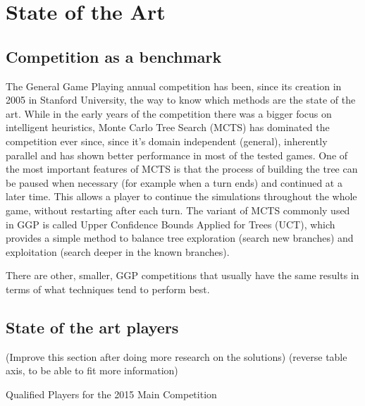 \chapter{State of the Art}
\label{chapter:state_of_the_art}

\section{Competition as a benchmark}
The General Game Playing annual competition has been, since its creation in 2005 in Stanford University, the way to know which methods are the state of the art. 
While in the early years of the competition there was a bigger focus on intelligent heuristics, Monte Carlo Tree Search (MCTS) has dominated the competition ever since, since it’s domain independent (general), inherently parallel and has shown better performance in most of the tested games. One of the most important features of MCTS is that the process of building the tree can be paused when necessary (for example when a turn ends) and continued at a later time. This allows a player to continue the simulations throughout the whole game, without restarting after each turn.
The variant of MCTS commonly used in GGP is called Upper Confidence Bounds Applied for Trees (UCT), which provides a simple method to balance tree exploration (search new branches) and exploitation (search deeper in the known branches). 

There are other, smaller, \gls{GGP} competitions that usually have the same results in terms of what techniques tend to perform best.


\section{State of the art players}

(Improve this section after doing more research on the solutions)
(reverse table axis, to be able to fit more information)

Qualified Players for the 2015 Main Competition

